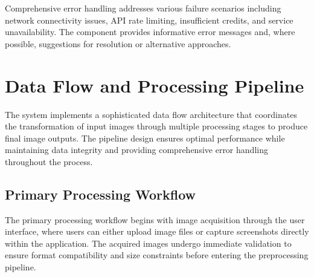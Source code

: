 Comprehensive error handling addresses various failure scenarios including network connectivity issues, API rate limiting, insufficient credits, and service unavailability. The component provides informative error messages and, where possible, suggestions for resolution or alternative approaches.

\section{Data Flow and Processing Pipeline}

The system implements a sophisticated data flow architecture that coordinates the transformation of input images through multiple processing stages to produce final image outputs. The pipeline design ensures optimal performance while maintaining data integrity and providing comprehensive error handling throughout the process.

\subsection{Primary Processing Workflow}

The primary processing workflow begins with image acquisition through the user interface, where users can either upload image files or capture screenshots directly within the application. The acquired images undergo immediate validation to ensure format compatibility and size constraints before entering the preprocessing pipeline.

